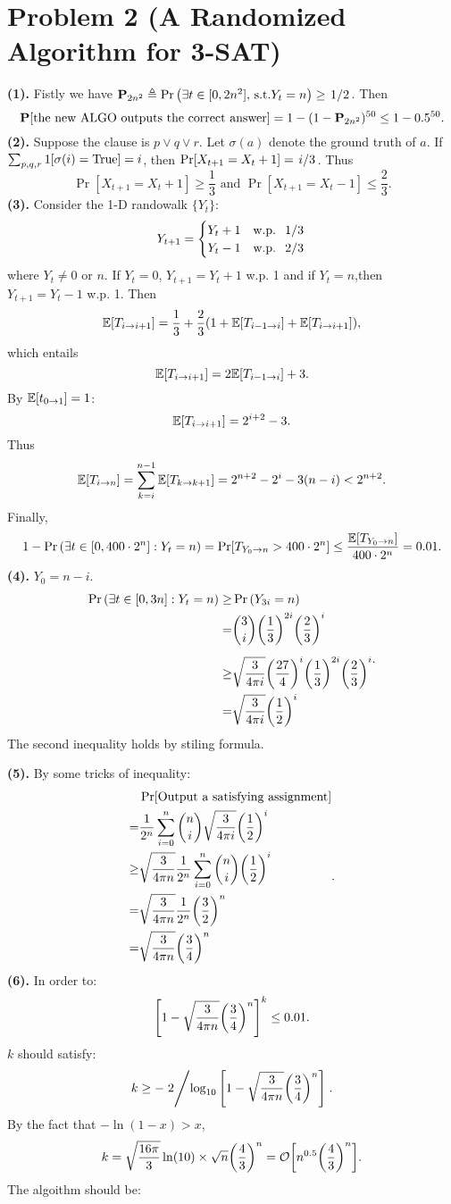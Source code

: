 \documentclass{article}
\begin{document}
\section*{Problem 2 (A Randomized Algorithm for 3-SAT)}
\textbf{(1).}
Fistly we have $\P_{2n^2}\defeq\Pr\qty(\exists t\in[0,2n^2],\,\-{s.t.}Y_t=n)\ge \flatfrac{1}{2}$. Then
\[
	\P[\text{the new ALGO outputs the correct answer}]
	=
	1-(1-\P_{2n^2})^{50}\le 1-0.5^{50}
	.\]
\textbf{(2).}
Suppose the clause is $p\lor q\lor r$. Let $\sigma(a)$ denote the ground truth of $a$. If $\sum_{p,q,r}1[\sigma(i)=\-{True}]=i$, then $\Pr[X_{t+1}=X_t+1]=\flatfrac{i}{3}$.
Thus
\[
	\Pr[X_{t+1}=X_t+1]\ge \frac{1}{3}\text{ and }\Pr[X_{t+1}=X_t-1]\le\frac{2}{3}
	.\]
\textbf{(3).}
Consider the 1-D randowalk $\{Y_t\}$:
\[
	Y_{t+1}=
	\begin{cases}
		Y_t+1 & \text{w.p. }\flatfrac{1}{3} \\
		Y_t-1 & \text{w.p. }\flatfrac{2}{3} \\
	\end{cases}
\] where $Y_t\ne 0$ or $n$.
If $Y_t=0$, $Y_{t+1}=Y_t+1$ w.p. 1 and if $Y_t=n$,then $Y_{t+1}=Y_t-1$ w.p. 1. Then
\[
	\=E[T_{i\to i+1}]=\frac{1}{3}+\frac{2}{3}(1+\=E[T_{i-1\to i}]+\=E[T_{i\to i+1}])
	,\] which entails
\[
	\=E[T_{i\to i+1}]=2\=E[T_{i-1\to i}]+3
	.\] By $\=E[t_{0\to 1}]=1$:
\[
	\=E[T_{i\to i+1}]=2^{i+2}-3
	.\] Thus
\[
	\=E[T_{i\to n}]=\sum_{k=i}^{n-1}\=E[T_{k\to k+1}]=2^{n+2}-2^i-3(n-i)<2^{n+2}
	.\]
Finally,
\[
	1-\Pr\qty(\exists t\in[0,400\cdot2^n]:Y_t=n)
	=
	\Pr[T_{Y_0\to n}>400\cdot2^n]
	\le
	\frac{\=E[T_{Y_0\to n}]}{400\cdot2^n}
	=
	0.01
	.\]
\textbf{(4).} $Y_0=n-i$.
\[
	\begin{aligned}
		\Pr\qty(\exists t\in[0,3n]:Y_t=n)
		\ge&
		\Pr\qty(Y_{3i}=n)
		\\=&
		\binom{3}{i}\qty(\frac{1}{3})^{2i}\qty(\frac{2}{3})^i
		\\[5pt]\ge &
		\sqrt{\frac{3}{4\pi i}}\qty(\frac{27}{4})^i\qty(\frac{1}{3})^{2i}\qty(\frac{2}{3})^i
		\\=&
		\sqrt{\frac{3}{4\pi i}}\qty(\frac{1}{2})^i
	\end{aligned}
.\]
The second inequality holds by stiling formula.

\newpage
\textbf{(5).} By some tricks of inequality:
\[
	\begin{aligned}
		&\Pr[\text{Output a satisfying assignment}]
		\\=&
		\frac{1}{2^n}\sum_{i=0}^n \binom{n}{i}\sqrt{\frac{3}{4\pi i}}\qty(\frac{1}{2})^i
		\\\ge &
		\sqrt{\frac{3}{4\pi n}}\frac{1}{2^n}\sum_{i=0}^n \binom{n}{i}\qty(\frac{1}{2})^i
		\\=&
		\sqrt{\frac{3}{4\pi n}}\frac{1}{2^n}\qty(\frac{3}{2})^n		
		\\=&
		\sqrt{\frac{3}{4\pi n}}\qty(\frac{3}{4})^n		
	\end{aligned}
.\] 
\textbf{(6).}
In order to:
\[
	\qty[1-\sqrt{\frac{3}{4\pi n}}\qty(\frac{3}{4})^n]^k
	\le 0.01
.\] 
$k$ should satisfy:
\[
	k\ge -\flatfrac{2}{\log_{10}\qty[1-\sqrt{\frac{3}{4\pi n}}\qty(\frac{3}{4})^n]}
.\] By the fact that $-\ln(1-x)>x$,
\[
	k=\sqrt{\frac{16\pi}{3}}\ln(10)\times
	\sqrt{n}\qty(\frac{4}{3})^n
	=
	\+O\qty[n^{0.5}\qty(\frac{4}{3})^n]
.\] 
The algoithm should be:
\end{document}
